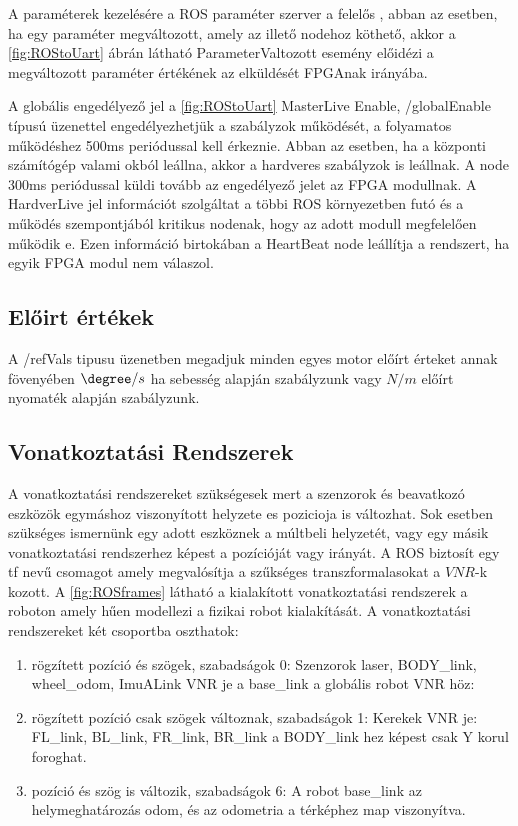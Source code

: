 A paraméterek kezelésére a ROS paraméter szerver a felelős \cite{parameterserver}, abban az esetben, ha egy paraméter megváltozott, amely az illető nodehoz köthető, akkor a \ref{fig:ROStoUart} ábrán látható ParameterValtozott esemény előidézi a  megváltozott paraméter értékének az elküldését  FPGAnak irányába.

A globális engedélyező jel a \ref{fig:ROStoUart} MasterLive Enable,  /globalEnable típusú üzenettel engedélyezhetjük a szabályzok működését, a folyamatos működéshez 500ms periódussal kell érkeznie. Abban az esetben, ha a központi számítógép valami okból leállna, akkor a hardveres szabályzok is leállnak. A node 300ms periódussal küldi tovább az engedélyező jelet az FPGA modullnak. A HardverLive jel információt szolgáltat a többi ROS környezetben futó és a működés szempontjából kritikus nodenak, hogy az adott modull megfelelően működik e. Ezen információ birtokában a HeartBeat node leállítja a rendszert, ha egyik FPGA modul nem válaszol.

\renewcommand{\img}{SajatRobot/ROS/NodeUML.jpg}
\renewcommand{\sources}{*}
\renewcommand{\captionn}{ROS integrálása Uart protokolhoz.}
\renewcommand{\figlabel}{ROStoUart}


\subsection{Előirt értékek}
A /refVals tipusu üzenetben megadjuk minden egyes motor előírt érteket annak fövenyében $\degree/s$ ha sebesség alapján szabályzunk vagy $N/m$ előírt nyomaték alapján szabályzunk.


\subsection{Vonatkoztatási Rendszerek }
A  vonatkoztatási rendszereket szükségesek mert a szenzorok és beavatkozó eszközök egymáshoz viszonyított helyzete es pozicioja is változhat. Sok esetben szükséges ismernünk egy adott eszköznek a múltbeli helyzetét, vagy egy másik vonatkoztatási rendszerhez képest a pozícióját vagy irányát. A ROS biztosít egy tf \cite{rosTF} nevű csomagot amely megvalósítja a szűkséges transzformalasokat a $VNR$-k kozott. 
A \ref{fig:ROSframes} látható a kialakított vonatkoztatási rendszerek a roboton amely hűen modellezi a fizikai robot kialakítását.
A vonatkoztatási rendszereket két csoportba oszthatok:

\begin{enumerate}[label=(\alph*)]
\item rögzített pozíció és szögek, szabadságok 0:
Szenzorok laser, BODY\_link, wheel\_odom, ImuALink VNR je a base\_link a globális robot VNR höz:
\item rögzített pozíció csak szögek változnak, szabadságok 1: Kerekek VNR je: FL\_link, BL\_link, FR\_link, BR\_link a BODY\_link hez képest csak Y korul foroghat.
\item pozíció és szög is változik, szabadságok 6:
A robot base\_link az helymeghatározás odom, és az odometria a térképhez map viszonyítva.
\end{enumerate}


